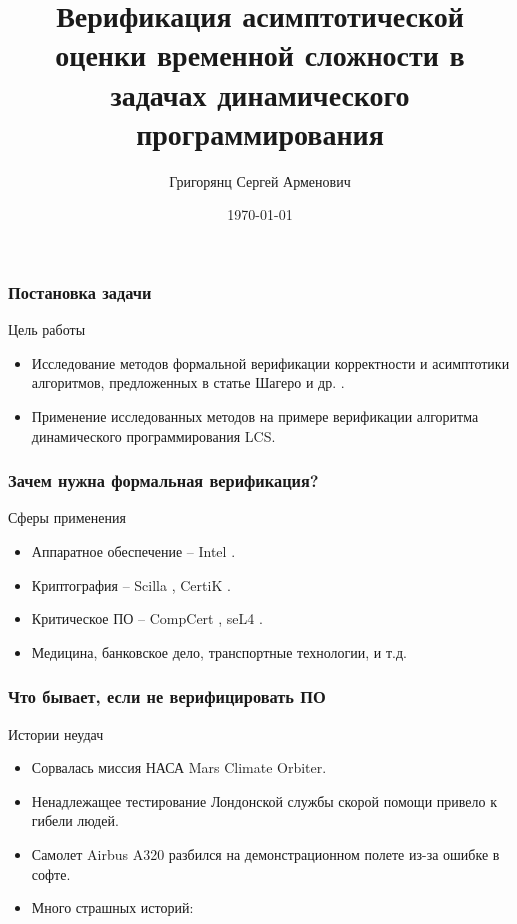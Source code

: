\documentclass{beamer}
\title[]{Верификация асимптотической оценки временной сложности в задачах динамического программирования} %
\author{Григорянц Сергей Арменович} %
\institute[] %
{Московский физико-технический институт \\
Физтех-школа Прикладной Математики и Информатики \\
Кафедра дискретной математики\\~\\ %
Научный руководитель: Дашков Евгений Владимирович
}
\date{\today} %
\begin{document}
\begin{frame}
	\titlepage
\end{frame}

\begin{frame}
	\frametitle{Постановка задачи}
	\begin{block}{Цель работы}
		\begin{itemize}
			\item<2-> Исследование методов формальной верификации корректности и асимптотики алгоритмов, предложенных в статье Шагеро и др. \cite{base_article}.
			\item<3-> Применение исследованных методов на примере верификации алгоритма динамического программирования LCS.
		\end{itemize}
	\end{block}
\end{frame}

\begin{frame}
	\frametitle{Зачем нужна формальная верификация?}
	\begin{block}{Сферы применения}
		\begin{itemize}
			\item<2-> Аппаратное обеспечение -- Intel \cite{intel}.
			\item<3-> Криптография -- Scilla \cite{Scilla}, CertiK \cite{CertiK}.
			\item<4-> Критическое ПО -- CompCert \cite{CompCert}, seL4 \cite{seL4}.
			\item<5-> Медицина, банковское дело, транспортные технологии, и т.д.
		\end{itemize}
	\end{block}
\end{frame}

\begin{frame}
	\frametitle{Что бывает, если не верифицировать ПО}
	\begin{block}{Истории неудач}
		\begin{itemize}
			\item<2-> Сорвалась миссия НАСА Mars Climate Orbiter.
			\item<3-> Ненадлежащее тестирование Лондонской службы скорой помощи привело к гибели людей.
			\item<4-> Самолет Airbus A320 разбился на демонстрационном полете из-за ошибке в софте.
			\item<5-> Много страшных историй: \cite{horror}
		\end{itemize}
	\end{block}
\end{frame}
\end{document}

